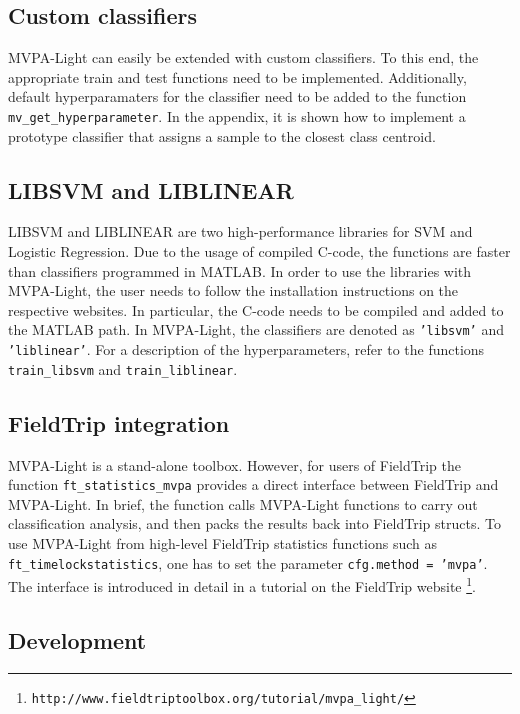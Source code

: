 \documentclass[utf8]{frontiersSCNS} %
\newcommand{\ttt}[1]{\texttt{#1}}
\begin{document}
\subsection{Custom classifiers}

MVPA-Light can easily be extended with custom classifiers. To this end, the appropriate train and test functions need to be implemented. Additionally, default hyperparamaters for the classifier need to be added to the function \ttt{mv\_get\_hyperparameter}. In the appendix, it is shown how to implement a prototype classifier that assigns a sample to the closest class centroid.

\subsection{LIBSVM and LIBLINEAR}

LIBSVM \cite{Chang2011LIBSVM:Machines} and LIBLINEAR \cite{Fan2008} are two high-performance libraries for SVM and Logistic Regression. Due to the usage of compiled C-code, the functions are faster than classifiers programmed in MATLAB. In order to use the libraries with MVPA-Light, the user needs to follow the installation instructions on the respective websites. In particular, the C-code needs to be compiled and added to the MATLAB path. In MVPA-Light, the classifiers are denoted as \ttt{'libsvm'} and \ttt{'liblinear'}. For a description of the hyperparameters, refer to the functions  \ttt{train\_libsvm} and \ttt{train\_liblinear}.

\subsection{FieldTrip integration}

MVPA-Light is a stand-alone toolbox. However, for users of FieldTrip \citep{Oostenveld2011} the function  \ttt{ft\_statistics\_mvpa} provides a direct interface between FieldTrip and MVPA-Light. In brief, the function calls MVPA-Light functions to carry out classification analysis, and then packs the results back into FieldTrip structs. To use MVPA-Light from high-level FieldTrip statistics functions such as \ttt{ft\_timelockstatistics}, one has to set the parameter \ttt{cfg.method = 'mvpa'}. The interface is introduced in detail in a tutorial on the FieldTrip website \footnote{\ttt{http://www.fieldtriptoolbox.org/tutorial/mvpa\_light/}}.

\subsection{Development}\label{sec:development}
\end{document}
